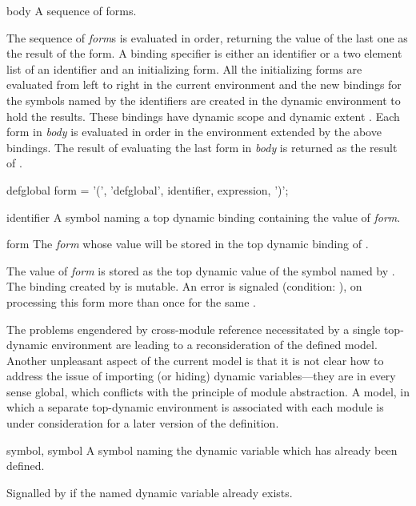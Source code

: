\begin{optDefinition}
\begin{arguments}
    \item[body] A sequence of forms.
\end{arguments}
%
\result%
The sequence of {\em form}s is evaluated in order, returning the value of the
last one as the result of the  form.
%
\remarks%
A binding specifier is either an identifier or a two element list of an
identifier and an initializing form.  All the initializing forms are evaluated
from left to right in the current environment and the new bindings for the
symbols named by the identifiers are created in the dynamic environment to hold
the results.  These bindings have dynamic scope and dynamic extent
.  Each
form in {\em body} is evaluated in order in the environment extended by the
above bindings.  The result of evaluating the last form in {\em body} is
returned as the result of .

%
\Syntax
\savesyntax{}\vbox{\syntax
defglobal form
   = '(', 'defglobal', identifier, expression, ')';
\endsyntax}
%
\begin{arguments}
    \item[identifier] A symbol naming a top dynamic binding containing the value
    of {\em form}.

    \item[form] The {\em form} whose value will be stored in the top dynamic
    binding of \identifier{}.
\end{arguments}
%
\remarks%
The value of {\em form} is stored as the top dynamic value of the symbol named
by \identifier{} .  The binding created by
 is mutable.  An error is signaled (condition:
), on processing this form more than
once for the same \identifier{}.
%
\begin{note}
    The problems engendered by cross-module reference necessitated by a single
    top-dynamic environment are leading to a reconsideration of the defined
    model.  Another unpleasant aspect of the current model is that it is not
    clear how to address the issue of importing (or hiding) dynamic
    variables---they are in every sense global, which conflicts with the
    principle of module abstraction.  A model, in which a separate top-dynamic
    environment is associated with each module is under consideration for a
    later version of the definition.
\end{note}

%
\begin{initoptions}
    \item[symbol, symbol] A symbol naming the dynamic variable which has already
    been defined.
\end{initoptions}
%
\remarks%
Signalled by  if the named dynamic variable already
exists.
\end{optDefinition}

